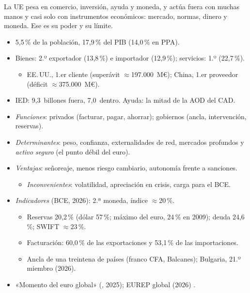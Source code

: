 \documentclass{article}
\begin{document}
\begin{columnas}
\begin{ideaclave}
La UE pesa en comercio, inversión, ayuda y moneda, y actúa fuera con muchas manos y casi solo con instrumentos económicos: mercado, normas, dinero y moneda. Ese es su poder y su límite.
\end{ideaclave}

\begin{itemize}
\item 5,5\,\% de la población, 17,9\,\% del PIB (14,0\,\% en PPA).
\item Bienes: 2.º exportador (13,8\,\%) e importador (12,9\,\%); servicios: 1.º (22,7\,\%).
  \begin{itemize}
  \item EE.\,UU., 1.er cliente (superávit $\approx$197.000~M€); China, 1.er proveedor (déficit $\approx$375.000~M€).
  \end{itemize}
\item IED: 9,3~billones fuera, 7,0~dentro. Ayuda: la mitad de la AOD del CAD.
\end{itemize}
\begin{itemize}
\item \emph{Funciones}: privados (facturar, pagar, ahorrar); gobiernos (ancla, intervención, reservas).
\item \emph{Determinantes}: peso, confianza, externalidades de red, mercados profundos y \emph{activo seguro} (el punto débil del euro).
\item \emph{Ventajas}: señoreaje, menos riesgo cambiario, autonomía frente a sanciones.
  \begin{itemize}
  \item \emph{Inconvenientes}: volatilidad, apreciación en crisis, carga para el BCE.
  \end{itemize}
\item \emph{Indicadores} (BCE, 2026): 2.ª moneda, índice $\approx$20\,\%.
  \begin{itemize}
  \item Reservas 20,2\,\% (dólar 57\,\%; máximo del euro, 24\,\% en 2009); deuda 24,6\,\%; SWIFT $\approx$23\,\%.
  \item Facturación: 60,0\,\% de las exportaciones y 53,1\,\% de las importaciones.
  \item Ancla de una treintena de países (franco CFA, Balcanes); Bulgaria, 21.º miembro (2026).
  \end{itemize}
\item «Momento del euro global» (, 2025); EUREP global (2026) .
\end{itemize}


\end{columnas}
\end{document}
